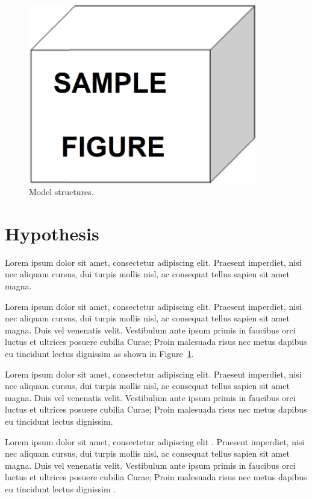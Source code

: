 \begin{figure}[!htb]
 \centering
 \includegraphics[width=10cm,keepaspectratio=true]{./fig/sekil1}
 \vspace*{4mm}
 \caption{Model structures.}
 \label{fig:ch1-1}
\end{figure}


\section{Hypothesis}

Lorem ipsum dolor sit amet, consectetur adipiscing elit. Praesent imperdiet, nisi 
nec aliquam cursus, dui turpis mollis nisl, ac consequat tellus sapien sit amet 
magna.

Lorem ipsum dolor sit amet, consectetur adipiscing elit. Praesent imperdiet, nisi 
nec aliquam cursus, dui turpis mollis nisl, ac consequat tellus sapien sit amet 
magna. Duis vel venenatis velit. Vestibulum ante ipsum primis in faucibus orci 
luctus et ultrices posuere cubilia Curae; Proin malesuada risus nec metus dapibus 
eu tincidunt lectus dignissim as shown in Figure~\ref{fig:ch1-1}. 

Lorem ipsum dolor sit amet, consectetur adipiscing elit. Praesent imperdiet, nisi 
nec aliquam cursus, dui turpis mollis nisl, ac consequat tellus sapien sit amet 
magna. Duis vel venenatis velit. Vestibulum ante ipsum primis in faucibus orci 
luctus et ultrices posuere cubilia Curae; Proin malesuada risus nec metus dapibus 
eu tincidunt lectus dignissim. 

Lorem ipsum dolor sit amet, consectetur adipiscing elit \cite{harper2007}. Praesent imperdiet, nisi 
nec aliquam cursus, dui turpis mollis nisl, ac consequat tellus sapien sit amet 
magna. Duis vel venenatis velit. Vestibulum ante ipsum primis in faucibus orci 
luctus et ultrices posuere cubilia Curae; Proin malesuada risus nec metus dapibus 
eu tincidunt lectus dignissim \cite{unesco}.

